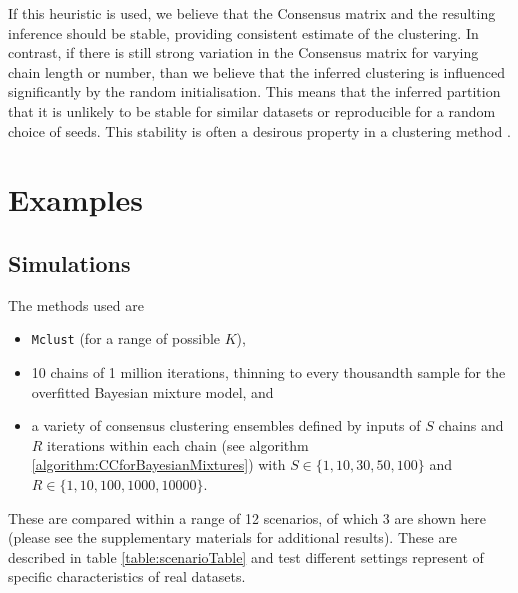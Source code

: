 \documentclass{bioinfo}
\begin{document}
If this heuristic is used, we believe that the Consensus matrix and the resulting inference should be stable, providing consistent estimate of the clustering. In contrast, if there is still strong variation in the Consensus matrix for varying chain length or number, than we believe that the inferred clustering is influenced significantly by the random initialisation. This means that the inferred partition that it is unlikely to be stable for similar datasets or reproducible for a random choice of seeds. This stability is often a desirous property in a clustering method \citep{von2005towards, meinshausen2010stability}.


\section{Examples}
\subsection{Simulations}
The methods used are 
\begin{itemize}
	\item \texttt{Mclust} (for a range of possible $K$),
	\item 10 chains of 1 million iterations, thinning to every thousandth sample for the overfitted Bayesian mixture model, and
	\item a variety of consensus clustering ensembles defined by inputs of $S$ chains and $R$ iterations within each chain (see algorithm \ref{algorithm:CCforBayesianMixtures}) with $S \in \{1, 10, 30, 50, 100\}$ and $R \in \{1, 10, 100, 1000, 10000\}$.
\end{itemize}
These are compared within a range of 12 scenarios, of which 3 are shown here (please see the supplementary materials for additional results). These are described in table \ref{table:scenarioTable} and test different settings represent of specific characteristics of real datasets.

\end{document}
